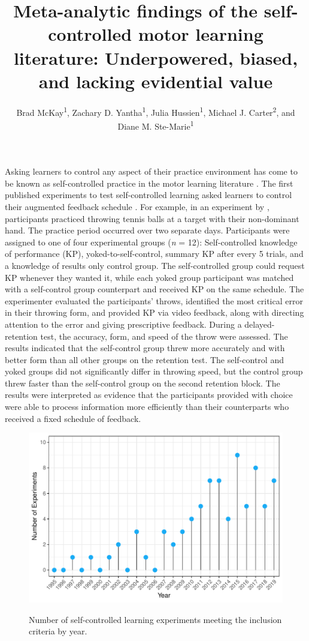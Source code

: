 \documentclass[man,floatsintext,hidelinks]{apa7}
\title{Meta-analytic findings of the self-controlled motor learning literature: Underpowered, biased, and lacking evidential value}
\author{Brad McKay\textsuperscript{1}, Zachary D. Yantha\textsuperscript{1}, Julia Hussien\textsuperscript{1}, Michael J. Carter\textsuperscript{2}, and Diane M. Ste-Marie\textsuperscript{1}}
\affiliation{\vspace*{18pt}\textsuperscript{1}\emph{School of Human Kinetics, University of Ottawa} \\
			 \textsuperscript{2}\emph{Department of Kinesiology, McMaster University}}
\begin{document}
\maketitle

Asking learners to control any aspect of their practice environment has come to be known as self-controlled practice in the motor learning literature \parencite{Sanli2013-xn,Wulf2016-gf}. The first published experiments to test self-controlled learning asked learners to control their augmented feedback schedule \parencite{Janelle1995-rj,Janelle1997-ht}. For example, in an experiment by \Textcite{Janelle1997-ht}, participants practiced throwing tennis balls at a target with their non-dominant hand. The practice period occurred over two separate days. Participants were assigned to one of four experimental groups (\emph{n} = 12): Self-controlled knowledge of performance (KP), yoked-to-self-control, summary KP after every 5 trials, and a knowledge of results only control group. The self-controlled group could request KP whenever they wanted it, while each yoked group participant was matched with a self-control group counterpart and received KP on the same schedule. The experimenter evaluated the participants’ throws, identified the most critical error in their throwing form, and provided KP via video feedback, along with directing attention to the error and giving prescriptive feedback. During a delayed-retention test, the accuracy, form, and speed of the throw were assessed. The results indicated that the self-control group threw more accurately and with better form than all other groups on the retention test. The self-control and yoked groups did not significantly differ in throwing speed, but the control group threw faster than the self-control group on the second retention block. The results were interpreted as evidence that the participants provided with choice were able to process information more efficiently than their counterparts who received a fixed schedule of feedback.

\begin{figure}[h]
	\caption{Number of self-controlled learning experiments meeting the inclusion criteria by year.}
	\centering
    \includegraphics[]{figs/fig1.pdf}
    \label{fig:Figure1}
\end{figure}
\end{document}
